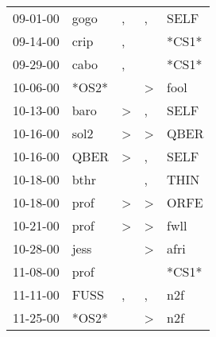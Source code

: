 \begin{supertabular}{p{0.07\textwidth}p{0.06\textwidth}p{0.02\textwidth}p{0.02\textwidth}p{0.06\textwidth}}
          09-01-00\textsuperscript{} &           gogo\textsuperscript{} &                , &                , &           SELF\textsuperscript{} \\
          09-14-00\textsuperscript{} &           crip\textsuperscript{} &                , &                  &                            *CS1* \\
          09-29-00\textsuperscript{} &           cabo\textsuperscript{} &                , &                  &                            *CS1* \\
          10-06-00\textsuperscript{} &                            *OS2* &                  &     \textgreater &           fool\textsuperscript{} \\
          10-13-00\textsuperscript{} &           baro\textsuperscript{} &     \textgreater &                , &           SELF\textsuperscript{} \\
          10-16-00\textsuperscript{} &           sol2\textsuperscript{} &     \textgreater &     \textgreater &           QBER\textsuperscript{} \\
          10-16-00\textsuperscript{} &           QBER\textsuperscript{} &     \textgreater &                , &           SELF\textsuperscript{} \\
          10-18-00\textsuperscript{} &           bthr\textsuperscript{} &                  &                , &           THIN\textsuperscript{} \\
          10-18-00\textsuperscript{} &           prof\textsuperscript{} &     \textgreater &     \textgreater &           ORFE\textsuperscript{} \\
          10-21-00\textsuperscript{} &           prof\textsuperscript{} &     \textgreater &     \textgreater &           fwll\textsuperscript{} \\
          10-28-00\textsuperscript{} &           jess\textsuperscript{} &                  &     \textgreater &           afri\textsuperscript{} \\
          11-08-00\textsuperscript{} &           prof\textsuperscript{} &                  &                  &                            *CS1* \\
          11-11-00\textsuperscript{} &           FUSS\textsuperscript{} &                , &                , &            n2f\textsuperscript{} \\
          11-25-00\textsuperscript{} &                            *OS2* &                  &     \textgreater &            n2f\textsuperscript{} \\

\end{supertabular}
